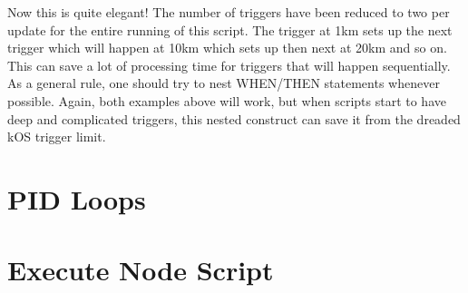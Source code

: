 Now this is quite elegant! The number of triggers have been reduced to two per update for the entire running of this script. The trigger at 1km sets up the next trigger which will happen at 10km which sets up then next at 20km and so on. This can save a lot of processing time for triggers that will happen sequentially. As a general rule, one should try to nest WHEN/THEN statements whenever possible. Again, both examples above will work, but when scripts start to have deep and complicated triggers, this nested construct can save it from the dreaded kOS trigger limit.

	\section{PID Loops}
	\section{Execute Node Script}